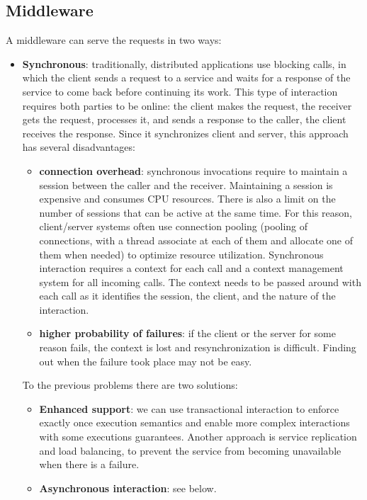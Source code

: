 \subsection{Middleware}
A middleware can serve the requests in two ways:
\begin{itemize}
    \item \textbf{Synchronous}: traditionally, distributed applications use blocking calls, in which the client sends a request to a service and waits for a response of the service to come back before continuing its work. This type of interaction requires both parties to be online: the client makes the request, the receiver gets the request, processes it, and sends a response to the caller, the client receives the response. Since it synchronizes client and server, this approach has several disadvantages:
          \begin{itemize}
              \item \textbf{connection overhead}: synchronous invocations require to maintain a session between the caller and the receiver. Maintaining a session is expensive and consumes CPU resources. There is also a limit on the number of sessions that can be active at the same time. For this reason, client/server systems often use connection pooling (pooling of connections, with a thread associate at each of them and allocate one of them when needed) to optimize resource utilization. Synchronous interaction requires a context for each call and a context management system for all incoming calls. The context needs to be passed around with each call as it identifies the session, the client, and the nature of the interaction.
              \item \textbf{higher probability of failures}: if the client or the server for some reason fails, the context is lost and resynchronization is difficult. Finding out when the failure took place may not be easy.
          \end{itemize}
          To the previous problems there are two solutions:
          \begin{itemize}
              \item \textbf{Enhanced support}: we can use transactional interaction to enforce exactly once execution semantics and enable more complex interactions with some executions guarantees. Another approach is service replication and load balancing, to prevent the service from becoming unavailable when there is a failure.
              \item \textbf{Asynchronous interaction}: see below.

\end{itemize}
\end{itemize}
